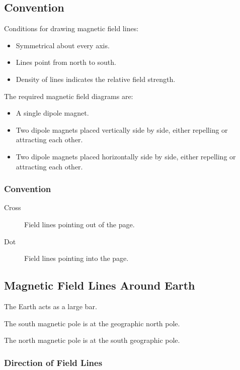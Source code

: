 \documentclass[a4paper,11pt]{article}
\begin{document}
\subsection{Convention}

Conditions for drawing magnetic field lines:

\begin{itemize}
\item Symmetrical about every axis.
\item Lines point from north to south.
\item Density of lines indicates the relative field strength.
\end{itemize}

The required magnetic field diagrams are:

\begin{itemize}
\item A single dipole magnet.
\item Two dipole magnets placed vertically side by side, either repelling or
	attracting each other.
\item Two dipole magnets placed horizontally side by side, either repelling or
	attracting each other.
\end{itemize}


\subsubsection{Convention}

\begin{description}
\item [Cross] Field lines pointing out of the page.
\item [Dot] Field lines pointing into the page.
\end{description}


\subsection{Magnetic Field Lines Around Earth}

The Earth acts as a large bar.

The south magnetic pole is at the geographic north pole.

The north magnetic pole is at the south geographic pole.


\subsubsection{Direction of Field Lines}
\end{document}
